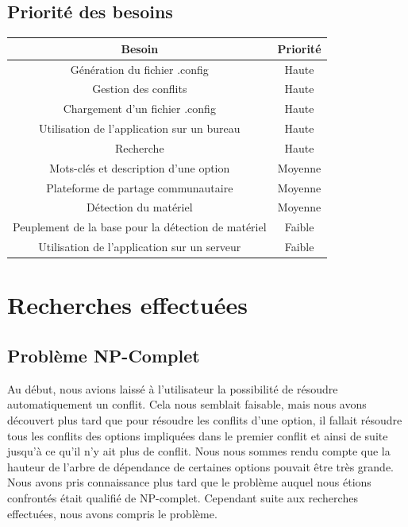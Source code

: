 \documentclass[17pts]{report}
\begin{document}
\subsection{Priorité des besoins}
\label{sub:Priorité des besoins}
\begin{tabular}{|c|c|}
    \hline
    Besoin & Priorité \\
    \hline
    \hline
    Génération du fichier .config & Haute \\
    \hline
    Gestion des conflits & Haute \\
    \hline
    Chargement d'un fichier .config & Haute \\
    \hline
    Utilisation de l'application sur un bureau & Haute \\
    \hline
    Recherche & Haute \\
    \hline
    Mots-clés et description d'une option & Moyenne \\
    \hline
    Plateforme de partage communautaire & Moyenne \\
    \hline
    Détection du matériel & Moyenne \\
    \hline
    Peuplement de la base pour la détection de matériel & Faible \\
    \hline
    Utilisation de l'application sur un serveur & Faible \\
    \hline
\end{tabular}

\section{Recherches effectuées}
\label{sec:Recherches effectuées}
\subsection{Problème NP-Complet}
\label{sub:Problème NP-Complet}
Au début, nous avions laissé à l'utilisateur la possibilité de résoudre
automatiquement un conflit. Cela nous semblait faisable, mais nous avons
découvert plus tard que pour résoudre les conflits d'une option, il fallait
résoudre tous les conflits des options impliquées dans le premier conflit et
ainsi de suite jusqu'à ce qu'il n'y ait plus de conflit. Nous nous sommes rendu
compte que la hauteur de l'arbre de dépendance de certaines options pouvait
être très grande. Nous avons pris connaissance plus tard que le problème auquel
nous étions confrontés était qualifié de NP-complet. Cependant suite aux
recherches effectuées, nous avons compris le problème.
\end{document}
